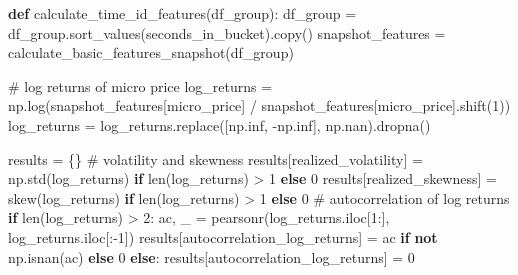 \documentclass[
  letterpaper,
  DIV=11,
  numbers=noendperiod]{scrartcl}
\newenvironment{Shaded}{\begin{snugshade}}{\end{snugshade}}
\newcommand{\BuiltInTok}[1]{\textcolor[rgb]{0.00,0.23,0.31}{#1}}
\newcommand{\CommentTok}[1]{\textcolor[rgb]{0.37,0.37,0.37}{#1}}
\newcommand{\ControlFlowTok}[1]{\textcolor[rgb]{0.00,0.23,0.31}{\textbf{#1}}}
\newcommand{\DecValTok}[1]{\textcolor[rgb]{0.68,0.00,0.00}{#1}}
\newcommand{\KeywordTok}[1]{\textcolor[rgb]{0.00,0.23,0.31}{\textbf{#1}}}
\newcommand{\NormalTok}[1]{\textcolor[rgb]{0.00,0.23,0.31}{#1}}
\newcommand{\OperatorTok}[1]{\textcolor[rgb]{0.37,0.37,0.37}{#1}}
\newcommand{\StringTok}[1]{\textcolor[rgb]{0.13,0.47,0.30}{#1}}
\begin{document}
\begin{Shaded}
\begin{Highlighting}[]
\KeywordTok{def}\NormalTok{ calculate\_time\_id\_features(df\_group):}
\NormalTok{    df\_group }\OperatorTok{=}\NormalTok{ df\_group.sort\_values(}\StringTok{\textquotesingle{}seconds\_in\_bucket\textquotesingle{}}\NormalTok{).copy()}
\NormalTok{    snapshot\_features }\OperatorTok{=}\NormalTok{ calculate\_basic\_features\_snapshot(df\_group)}

    \CommentTok{\# log returns of micro price}
\NormalTok{    log\_returns }\OperatorTok{=}\NormalTok{ np.log(snapshot\_features[}\StringTok{\textquotesingle{}micro\_price\textquotesingle{}}\NormalTok{] }\OperatorTok{/}\NormalTok{ snapshot\_features[}\StringTok{\textquotesingle{}micro\_price\textquotesingle{}}\NormalTok{].shift(}\DecValTok{1}\NormalTok{))}
\NormalTok{    log\_returns }\OperatorTok{=}\NormalTok{ log\_returns.replace([np.inf, }\OperatorTok{{-}}\NormalTok{np.inf], np.nan).dropna()}

\NormalTok{    results }\OperatorTok{=}\NormalTok{ \{\}}
    \CommentTok{\# volatility and skewness}
\NormalTok{    results[}\StringTok{\textquotesingle{}realized\_volatility\textquotesingle{}}\NormalTok{] }\OperatorTok{=}\NormalTok{ np.std(log\_returns) }\ControlFlowTok{if} \BuiltInTok{len}\NormalTok{(log\_returns) }\OperatorTok{\textgreater{}} \DecValTok{1} \ControlFlowTok{else} \DecValTok{0}
\NormalTok{    results[}\StringTok{\textquotesingle{}realized\_skewness\textquotesingle{}}\NormalTok{] }\OperatorTok{=}\NormalTok{ skew(log\_returns) }\ControlFlowTok{if} \BuiltInTok{len}\NormalTok{(log\_returns) }\OperatorTok{\textgreater{}} \DecValTok{1} \ControlFlowTok{else} \DecValTok{0}
    \CommentTok{\# autocorrelation of log returns}
    \ControlFlowTok{if} \BuiltInTok{len}\NormalTok{(log\_returns) }\OperatorTok{\textgreater{}} \DecValTok{2}\NormalTok{:}
\NormalTok{        ac, \_ }\OperatorTok{=}\NormalTok{ pearsonr(log\_returns.iloc[}\DecValTok{1}\NormalTok{:], log\_returns.iloc[:}\OperatorTok{{-}}\DecValTok{1}\NormalTok{])}
\NormalTok{        results[}\StringTok{\textquotesingle{}autocorrelation\_log\_returns\textquotesingle{}}\NormalTok{] }\OperatorTok{=}\NormalTok{ ac }\ControlFlowTok{if} \KeywordTok{not}\NormalTok{ np.isnan(ac) }\ControlFlowTok{else} \DecValTok{0}
    \ControlFlowTok{else}\NormalTok{:}
\NormalTok{        results[}\StringTok{\textquotesingle{}autocorrelation\_log\_returns\textquotesingle{}}\NormalTok{] }\OperatorTok{=} \DecValTok{0}


\end{Highlighting}
\end{Shaded}
\end{document}
